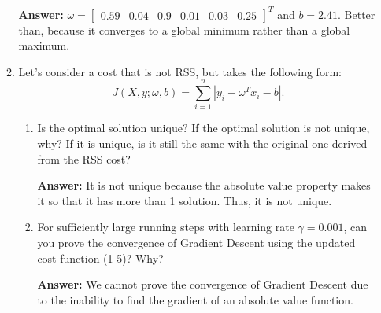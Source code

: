 \documentclass{assignment}
\begin{document}
\begin{problem}
\begin{enumerate}
\begin{enumerate}[label=(\alph*)]
        \color{blue}\textbf{Answer:} $\omega = \begin{bmatrix} 0.59 & 0.04 & 0.9 & 0.01 & 0.03 & 0.25\end{bmatrix}^T$ and $b = 2.41$. Better than, because it converges to a global minimum rather than a global maximum.\color{black}


        
        \item Let's consider a cost that is not RSS, but takes the following form:\\
        \begin{displaymath}
            J(X, y;\omega, b) = \sum\limits^n_{i=1} |y_i - \omega^Tx_i - b|.
            \tag*{(1-5)}
        \end{displaymath}

        \begin{enumerate}[label=\roman*.]


        
            \item Is the optimal solution unique? If the optimal solution is not unique, why? If it is unique, is it still the same with the original one derived from the RSS cost?

            \color{blue}\textbf{Answer:} It is not unique because the absolute value property makes it so that it has more than 1 solution. Thus, it is not unique.\color{black}


        
            \item For sufficiently large running steps with learning rate $\gamma = 0.001$, can you prove the convergence of Gradient Descent using the updated cost function (1-5)? Why?

            \color{blue}\textbf{Answer:} We cannot prove the convergence of Gradient Descent due to the inability to find the gradient of an absolute value function.\color{black}


\end{enumerate}
\end{enumerate}
\end{enumerate}
\end{problem}
\end{document}
